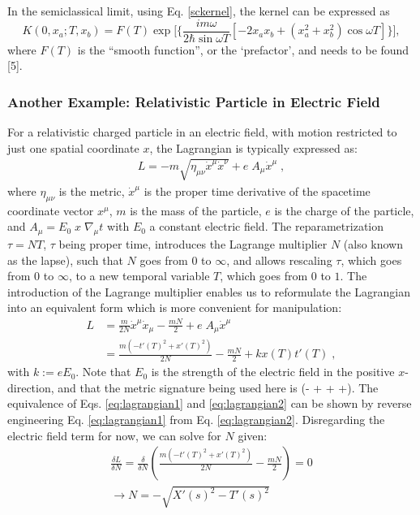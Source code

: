 \documentclass[12pt]{revtex4}
\begin{document}
In the semiclassical limit, using Eq. \ref{sckernel}, the kernel can be expressed as 
\[ K(0,x_a;T,x_b)=F(T) \exp \Bigg[{\Bigg\{\frac{im\omega}{2 \hbar \sin\omega T} [-2 x_a x_b + (x_a^2 + x_b^2) \cos \omega T]\Bigg\}}\Bigg],\]
where $F(T)$ is the ``smooth function'', or the `prefactor', and needs to be found [5]. 

\subsubsection{Another Example: Relativistic Particle in Electric Field}
For a relativistic charged particle in an electric field, with motion restricted to just one spatial coordinate $x$, the Lagrangian is typically expressed as:
\begin{align} \label{eq:lagrangian1}
L = - m \sqrt{\eta_{\mu \nu} \dot{x}^{\mu} \dot{x}^{\nu} } + e \; A_\mu \dot{x}^{\mu} \;,
\end{align}
where $\eta_{\mu \nu}$ is the metric, $\dot{x}^{\mu}$ is the proper time derivative of the spacetime coordinate vector $x^{\mu}$, $m$ is the mass of the particle, $e$ is the charge of the particle, and $A_\mu = E_0 \; x \; \nabla_\mu t$ with $E_0$ a constant electric field. The reparametrization $\tau = N T$, $\tau$ being proper time, introduces the Lagrange multiplier $N$ (also known as the lapse), such that $N$ goes from $0$ to $\infty$, and allows rescaling $\tau$, which goes from $0$ to $\infty$, to a new temporal variable $T$, which goes from $0$ to $1$. The introduction of the Lagrange multiplier enables us to reformulate the Lagrangian into an equivalent form which is more convenient for manipulation:
\begin{align} \label{eq:lagrangian2}
L &= \frac{m}{2N}\dot{x}^{\mu} \dot{x}_{\mu} -\frac{m N}{2} + e \; A_\mu \dot{x}^{\mu}  \\
 &= \frac{m (-t'(T)^2 + x'(T)^2)}{2N} -\frac{m N}{2} + k x(T) t'(T) \;,
\end{align}
with $k := e E_0$. Note that $E_0$ is the strength of the electric field in the positive $x$-direction, and that the metric signature being used here is (- + + +). The equivalence of Eqs. \ref{eq:lagrangian1} and \ref{eq:lagrangian2} can be shown by reverse engineering Eq. \ref{eq:lagrangian1} from Eq. \ref{eq:lagrangian2}. Disregarding the electric field term for now, we can solve for $N$ given:
\begin{align}
\frac{\delta L}{\delta N} = \frac{\delta}{\delta N} \left(\frac{m (-t'(T)^2 + x'(T)^2)}{2N} -\frac{m N}{2}\right) = 0 \\
\to N = -\sqrt{X'(s)^2-T'(s)^2}
\end{align}
\end{document}
